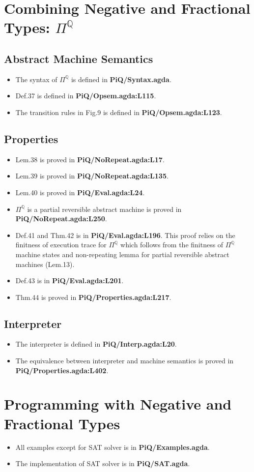 \documentclass{article}
\begin{document}
\section{Combining Negative and Fractional Types: $\Pi^{\mathbb{Q}}$}
\subsection{Abstract Machine Semantics}
\begin{itemize}
\item The syntax of $\Pi^{\mathbb{Q}}$ is defined in \textbf{PiQ/Syntax.agda}.
\item Def.37 is defined in \textbf{PiQ/Opsem.agda:L115}.
\item The transition rules in Fig.9 is defined in \textbf{PiQ/Opsem.agda:L123}.
\end{itemize}

\subsection{Properties}
\begin{itemize}
\item Lem.38 is proved in \textbf{PiQ/NoRepeat.agda:L17}.
\item Lem.39 is proved in \textbf{PiQ/NoRepeat.agda:L135}.
\item Lem.40 is proved in \textbf{PiQ/Eval.agda:L24}.
\item $\Pi^{\mathbb{Q}}$ is a partial reversible abstract machine is proved in \textbf{PiQ/NoRepeat.agda:L250}.
\item Def.41 and Thm.42 is in \textbf{PiQ/Eval.agda:L196}. This proof relies on the finitness of execution trace
  for $\Pi^{\mathbb{Q}}$ which follows from the finitness of $\Pi^{\mathbb{Q}}$ machine states and non-repeating lemma for partial
  reversible abstract machines (Lem.13).
\item Def.43 is in \textbf{PiQ/Eval.agda:L201}.
\item Thm.44 is proved in \textbf{PiQ/Properties.agda:L217}.
\end{itemize}

\subsection{Interpreter}
\begin{itemize}
\item The interpreter is defined in \textbf{PiQ/Interp.agda:L20}.
\item The equivalence between interpreter and machine semantics is proved in \textbf{PiQ/Properties.agda:L402}.
\end{itemize}

\section{Programming with Negative and Fractional Types}
\begin{itemize}
\item All examples except for SAT solver is in \textbf{PiQ/Examples.agda}.
\item The implementation of SAT solver is in \textbf{PiQ/SAT.agda}.
\end{itemize}
\end{document}

